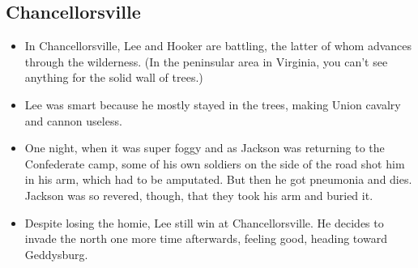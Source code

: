 \documentclass{article}
\begin{document}
  \subsection{Chancellorsville}
    \begin{itemize}
      \item In Chancellorsville, Lee and Hooker are battling, the latter of whom advances through the wilderness. (In the peninsular area in Virginia, you can't see anything for the solid wall of trees.)
      \item Lee was smart because he mostly stayed in the trees, making Union cavalry and cannon useless.
      \item One night, when it was super foggy and as Jackson was returning to the Confederate camp, some of his own soldiers on the side of the road shot him in his arm, which had to be amputated. But then he got pneumonia and dies. Jackson was so revered, though, that they took his arm and buried it.
      \item Despite losing the homie, Lee still win at Chancellorsville. He decides to invade the north one more time afterwards, feeling good, heading toward Geddysburg.
    \end{itemize}
\end{document}
